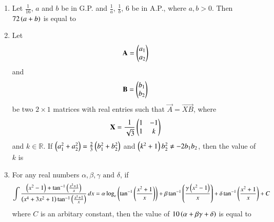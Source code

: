 \documentclass[journal,onecolumn]{IEEEtran}
\theoremstyle{remark}
\begin{document}
\begin{enumerate}
    \item Let $\frac{1}{16}$, $a$ and $b$ be in G.P. and $\frac{1}{a}$, $\frac{1}{b}$, $6$ be in A.P., where $a, b >0$. Then $72\left(a+b\right)$ is equal to

    \item Let 
	\begin{align*}
		\mathbf{A} = \begin{pmatrix}a_1\\a_2\end{pmatrix}
	\end{align*} and
	\begin{align*}
		\mathbf{B} = \begin{pmatrix}b_1\\b_2\end{pmatrix}
	\end{align*}
	be two $2\times 1$ matrices with real entries such that $\vec{A} = \vec{XB}$, where
	\begin{align*}
		\mathbf{X} = \frac{1}{\sqrt{3}}\begin{pmatrix}1 & -1\\1 & k\end{pmatrix}
	\end{align*}
	and $k \in \mathbb{R}$. If $\left(a_1^2 + a_2^2\right) = \frac{2}{3} \left(b_1^2 + b_2^2\right)$ and $\left(k^2 + 1\right) b_2^2 \neq -2b_1b_2$, then the value of $k$ is

    \item For any real numbers $\alpha, \beta, \gamma \text{ and } \delta$, if
	\begin{align*}
		\int \frac{\left(x^2 - 1\right) + \tan^{-1}{\left(\frac{x^2+1}{x}\right)}}{\left(x^4 + 3x^2 + 1\right)\tan^{-1}{\left(\frac{x^2+1}{x}\right)}} \, dx = \alpha\log_{e}\left(\tan^{-1}{\left(\frac{x^2+1}{x}\right)}\right) + \beta\tan^{-1}{\left(\frac{\gamma\left(x^2-1\right)}{x}\right)} + \delta\tan^{-1}{\left(\frac{x^2+1}{x}\right)} + C
	\end{align*}
	where $C$ is an arbitary constant, then the value of $10\left(\alpha + \beta\gamma + \delta\right)$ is equal to
\end{enumerate}
\end{document}
